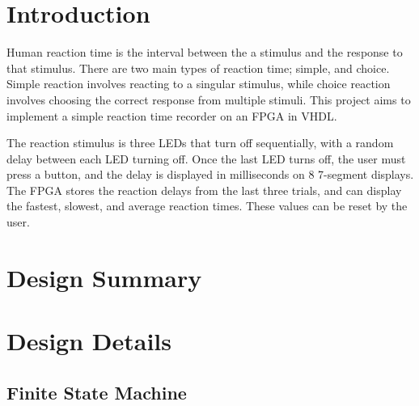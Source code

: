 \documentclass[12pt]{article}
\begin{document}
\newpage
{}

\section{Introduction}

Human reaction time is the interval between the a stimulus and the response to that stimulus. There are two main types of reaction time; simple, and choice. Simple reaction involves reacting to a singular stimulus, while choice reaction involves choosing the correct response from multiple stimuli. This project aims to implement a simple reaction time recorder on an FPGA in VHDL.

The reaction stimulus is three LEDs that turn off sequentially, with a random delay between each LED turning off. Once the last LED turns off, the user must press a button, and the delay is displayed in milliseconds on 8 7-segment displays. The FPGA stores the reaction delays from the last three trials, and can display the fastest, slowest, and average reaction times. These values can be reset by the user.

\section{Design Summary}


\newpage

\section{Design Details}


\subsection{Finite State Machine}
\end{document}

